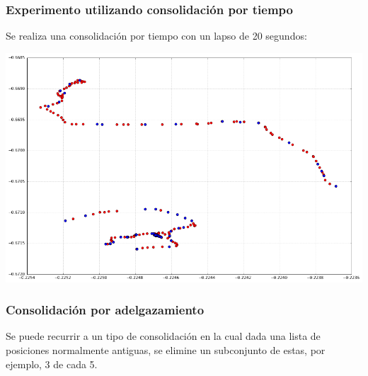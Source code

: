 \documentclass[10pt, spanish]{beamer}
\begin{document}
\begin{frame}[fragile]
\frametitle{Experimento utilizando consolidaci\'on por tiempo}
Se realiza una consolidaci\'on por tiempo con un lapso de 20 segundos:\\

\bigskip

\begin{center}
	\includegraphics[scale=.3]{byTimeSuj1.png}
\end{center}

\end{frame}


\begin{frame}[fragile]
\frametitle{Consolidaci\'on por adelgazamiento}
Se puede recurrir a un tipo de consolidaci\'on en la cual dada una lista de posiciones normalmente antiguas, se elimine un subconjunto de estas, por ejemplo, 3 de cada 5.\\
\bigskip
\begin{algorithmic}[1]
			\EndFor
		\EndIf
	\EndFor
\EndFunction
\end{algorithmic}
\end{frame}
\end{document}
